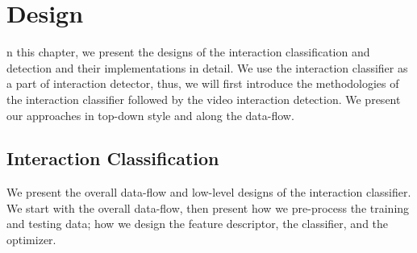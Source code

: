 %
%
\let\textcircled=\pgftextcircled
\chapter{Design}
\label{chap4}

n this chapter, we present the designs of the interaction classification and detection and their implementations in detail. We use the  interaction classifier as a part of interaction detector, thus, we will first introduce the methodologies of the interaction classifier followed by the video interaction detection. We present our approaches in top-down style and along the data-flow.

\section{Interaction Classification}
We present the overall data-flow and low-level designs of the interaction classifier. We start with the overall data-flow, then present how we pre-process the training and testing data; how we design the feature descriptor, the classifier, and the optimizer. 

